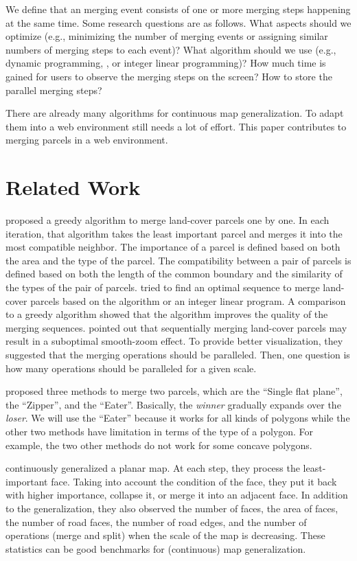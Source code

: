 \documentclass[ijgi,article,submit,moreauthors,pdftex]{Definitions/mdpi}
\begin{document}
We define that an merging event consists of 
one or more merging steps happening at the same time.
Some research questions are as follows.
What aspects should we optimize 
(e.g., minimizing the number of merging events or 
assigning similar numbers of merging steps to each event)?
What algorithm should we use 
(e.g., dynamic programming, \Astar, or integer linear programming)?
How much time is gained for users to observe the merging steps on the screen?
How to store the parallel merging steps?

There are already many algorithms for continuous map generalization.
To adapt them into a web environment still needs a lot of effort.
This paper contributes to merging parcels in a web environment. 
 
\section{Related Work}
\citet{vanOosterom2005} proposed a greedy algorithm 
to merge land-cover parcels one by one.
In each iteration, that algorithm takes the least important parcel and 
merges it into the most compatible neighbor.
The importance of a parcel is defined 
based on both the area and the type of the parcel.
The compatibility between a pair of parcels is defined based on 
both the length of the common boundary and the similarity of the types 
of the pair of parcels. 
\citet[]{Peng2019Thesis} tried to find an optimal sequence 
to merge land-cover parcels
based on the \Astar algorithm or an integer linear program.
A comparison to a greedy algorithm showed that 
the \Astar algorithm improves the quality of the merging sequences.
\citet{vanOosterom2014Support} pointed out that sequentially merging
land-cover parcels may result in a suboptimal smooth-zoom effect.
To provide better visualization, they suggested that
the merging operations should be paralleled.
Then, one question is how many operations 
should be paralleled for a given scale.

\citet{Suba2014Merge} proposed three methods to merge two parcels, 
which are the ``Single flat plane'', the ``Zipper'', and the ``Eater''.
Basically, the \emph{winner} gradually expands over the \emph{loser}.
We will use the ``Eater'' because it works for all kinds of polygons 
while the other two methods have limitation in terms of the type of a polygon.
For example, the two other methods do not work for some concave polygons.



\citet{Suba2016Road} continuously generalized a planar map.
At each step, they process the least-important face.
Taking into account the condition of the face,
they put it back with higher importance, collapse it, 
or merge it into an adjacent face.
In addition to the generalization, 
they also observed the number of faces,
the area of faces, the number of road faces, the number of road edges,
and the number of operations (merge and split) 
when the scale of the map is decreasing.
These statistics can be good benchmarks for (continuous) map generalization.
\end{document}
